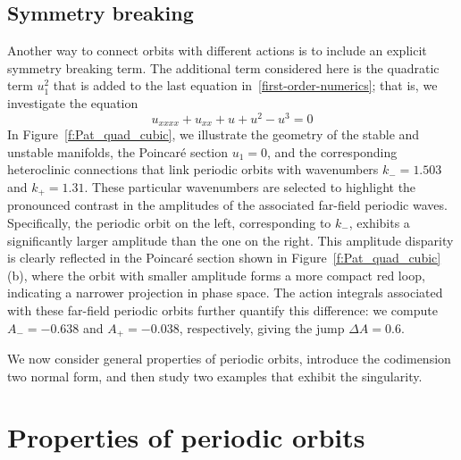 \documentclass[10pt]{article}
\begin{document}
\subsection{Symmetry breaking}
\label{subsec-gnlse-symmetrybreaking}

Another way to connect orbits with different actions is to include an explicit
symmetry breaking term. The additional term considered here is the quadratic
term $u_1^2$ that is added to the last equation in~\eqref{first-order-numerics}; that is, we investigate the equation 
%
\begin{equation}\label{gnlse-with-quadratic-nonlinearity}
u_{xxxx} + u_{xx} + u + u^2 - u^3=0
\end{equation}
%
In Figure~\ref{f:Pat_quad_cubic}, we illustrate the geometry of the stable and
unstable manifolds, the Poincar\'e section $u_1 = 0$, and the corresponding
heteroclinic connections that link periodic orbits with wavenumbers \( k_- =
1.503 \) and \( k_+ = 1.31 \). These particular wavenumbers are selected to
highlight the pronounced contrast in the amplitudes of the associated far-field
periodic waves. Specifically, the periodic orbit on the left, corresponding to
\( k_- \), exhibits a significantly larger amplitude than the one on the right.
This amplitude disparity is clearly reflected in the Poincar\'e section shown in
Figure~\ref{f:Pat_quad_cubic}(b), where the orbit with smaller amplitude forms a
more compact red loop, indicating a narrower projection in phase space.
The action integrals associated with these far-field periodic orbits further
quantify this difference: we compute \( A_- = -0.638 \) and \( A_+ = -0.038 \),
respectively, giving the jump $\Delta A = 0.6$.

We now consider general properties of periodic orbits, introduce the codimension two normal form, and then study two examples that exhibit the singularity.

\section{Properties of periodic orbits}
\setcounter{equation}{0}
\label{sec-periodic-states}
\end{document}
